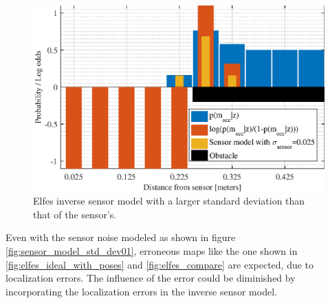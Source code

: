 \begin{figure}[htbp]
	\centering
	\includegraphics[scale=1.0]{figures/static_mapping/sensor_model_std_dev025}
	\caption{Elfes inverse sensor model with a larger standard deviation than that of the sensor's.}
	\label{fig:sensor_model_std_dev025}
\end{figure}

Even with the sensor noise modeled as shown in figure \ref{fig:sensor_model_std_dev01}, erroneous maps like the one shown in \ref{fig:elfes_ideal_with_poses} and \ref{fig:elfes_compare} are expected, due to localization errors.
The influence of the error could be diminished by incorporating the localization errors in the inverse sensor model.

